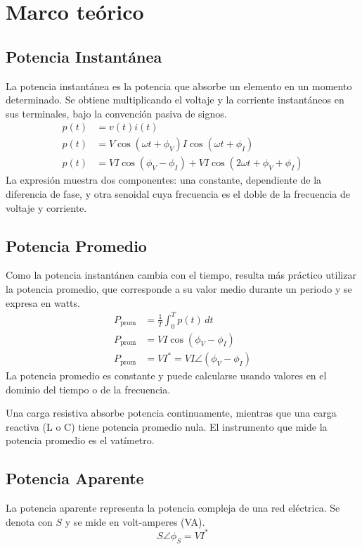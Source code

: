 \documentclass[12pt,a4paper]{article}
\begin{document}
\section{Marco teórico}
\subsection{Potencia Instantánea}
La potencia instantánea es la potencia que absorbe un elemento en un momento determinado. Se obtiene multiplicando el voltaje y la corriente instantáneos en sus terminales, bajo la convención pasiva de signos.
\begin{align}
    p(t) &= v(t)i(t) \\
    p(t) &= V\cos(\omega t + \phi_V)I\cos(\omega t + \phi_I) \\
    p(t) &= VI\cos(\phi_V - \phi_I) + VI\cos(2\omega t + \phi_V + \phi_I)
\end{align}
La expresión muestra dos componentes: una constante, dependiente de la diferencia de fase, y otra senoidal cuya frecuencia es el doble de la frecuencia de voltaje y corriente.

\subsection{Potencia Promedio}
Como la potencia instantánea cambia con el tiempo, resulta más práctico utilizar la potencia promedio, que corresponde a su valor medio durante un periodo y se expresa en watts.
\begin{align}
    P_{\mathrm{prom}} &= \frac{1}{T}\int_0^T p(t)\,dt \\
    P_{\mathrm{prom}} &= VI\cos(\phi_V - \phi_I) \\
    P_{\mathrm{prom}} &= VI^{*} = VI\angle(\phi_V - \phi_I)
\end{align}
La potencia promedio es constante y puede calcularse usando valores en el dominio del tiempo o de la frecuencia.

Una carga resistiva absorbe potencia continuamente, mientras que una carga reactiva (L o C) tiene potencia promedio nula. El instrumento que mide la potencia promedio es el vatímetro.

\subsection{Potencia Aparente}
La potencia aparente representa la potencia compleja de una red eléctrica. Se denota con $S$ y se mide en volt-amperes (VA).
\begin{equation}
    S\angle\phi_S = VI^{*}
\end{equation}
\end{document}

